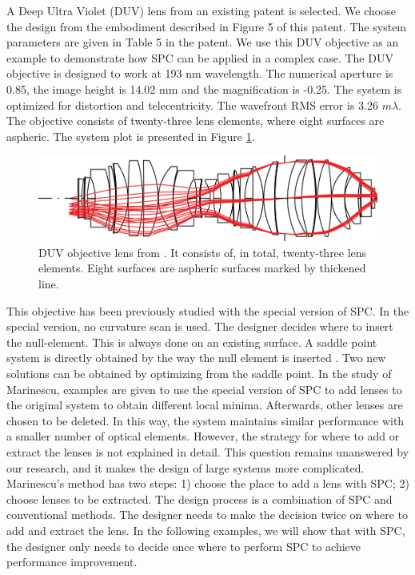 A Deep Ultra Violet (DUV) lens from an existing patent \cite{patentZeissDUV} is selected. We choose the design from the embodiment described in Figure 5 of this patent. The system parameters are given in Table 5 in the patent. We use this DUV objective as an example to demonstrate how SPC can be applied in a complex case. The DUV objective is designed to work at 193 nm wavelength. The numerical aperture is 0.85, the image height is 14.02 mm and the magnification is -0.25. The system is optimized for distortion and telecentricity. The wavefront RMS error is 3.26 $m\lambda$. The objective consists of twenty-three lens elements, where eight surfaces are aspheric. The system plot is presented in Figure \ref{fig: litho_DUV_plot}. 
\begin{figure}[h!]
    \centering
    \includegraphics[width=\textwidth]{chapter-4/figures/Litho_DUV_plot.png}
    \caption{DUV objective lens from \cite{patentZeissDUV}. It consists of, in total, twenty-three lens elements. Eight surfaces are aspheric surfaces marked by thickened line.}
    \label{fig: litho_DUV_plot}
\end{figure}

This objective has been previously studied with the special version of SPC. In the special version, no curvature scan is used. The designer decides where to insert the null-element. This is always done on an existing surface. A saddle point system is directly obtained by the way the null element is inserted \cite{BociortSPCSexplained}. Two new solutions can be obtained by optimizing from the saddle point. In the study of Marinescu\cite{OanaThesis2006}\cite{OanaOEngPart2}, examples are given to use the special version of SPC to add lenses to the original system to obtain different local minima. Afterwards, other lenses are chosen to be deleted. In this way, the system maintains similar performance with a smaller number of optical elements. However, the strategy for where to add or extract the lenses is not explained in detail. This question remains unanswered by our research, and it makes the design of large systems more complicated. Marinescu's method has two steps: 1) choose the place to add a lens with SPC; 2) choose lenses to be extracted. The design process is a combination of SPC and conventional methods. The designer needs to make the decision twice on where to add and extract the lens. In the following examples, we will show that with SPC, the designer only needs to decide once where to perform SPC to achieve performance improvement. 

